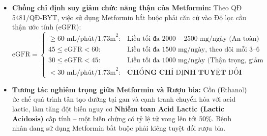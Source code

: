 \documentclass[12pt,a4paper]{article}
\begin{document}
\begin{enumerate}[leftmargin=1.2cm]
\begin{itemize}[leftmargin=0.8cm]
        \item \textbf{Chống chỉ định suy giảm chức năng thận của Metformin:}
        Theo QĐ 5481/QĐ-BYT, việc sử dụng Metformin bắt buộc phải căn cứ vào Độ lọc cầu thận ước tính (eGFR):
        \begin{equation}
            \text{eGFR} = \begin{cases}
                \ge 60\text{ mL/phút/1.73m}^2: & \text{Liều tối đa 2000 -- 2500 mg/ngày (An toàn)} \\
                45 \le \text{eGFR} < 60: & \text{Liều tối đa 1500 mg/ngày, theo dõi mỗi 3--6 tháng} \\
                30 \le \text{eGFR} < 45: & \text{Liều tối đa 1000 mg/ngày (Thận trọng, giảm 50\% liều)} \\
                < 30\text{ mL/phút/1.73m}^2: & \textbf{CHỐNG CHỈ ĐỊNH TUYỆT ĐỐI}
            \end{cases}
        \end{equation}
        \item \textbf{Tương tác nghiêm trọng giữa Metformin và Rượu bia:}
        Cồn (Ethanol) ức chế quá trình tân tạo đường tại gan và cạnh tranh chuyển hóa với acid lactic, làm tăng đột biến nguy cơ \textbf{Nhiễm toan Acid Lactic (Lactic Acidosis)} cấp tính -- một biến chứng có tỷ lệ tử vong lên tới 50\%. Bệnh nhân đang sử dụng Metformin bắt buộc phải kiêng tuyệt đối rượu bia.
    \end{itemize}
\end{enumerate}
\end{document}

